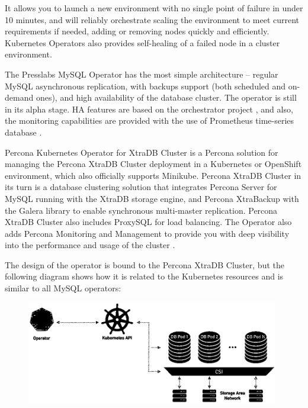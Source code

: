 \documentclass[10pt, a5paper]{article}
\begin{document}
It allows you to launch a new environment with no single point of failure in under 10 minutes, and will reliably orchestrate scaling the environment to meet current requirements if needed, adding or removing nodes quickly and efficiently. Kubernetes Operators also provides self-healing of a failed node in a cluster environment.

The Presslabs MySQL Operator \cite{bib1} has the most simple architecture -- regular MySQL asynchronous replication, with backups support (both scheduled and on-demand ones), and high availability of the database cluster. The operator is still in its alpha stage. HA features are based on the orchestrator project \cite{bib4}, and also, the monitoring capabilities are provided with the use of Prometheus time-series database \cite{bib5}.

Percona Kubernetes Operator for XtraDB Cluster \cite{bib2} is a Percona solution for managing the Percona XtraDB Cluster deployment in a Kubernetes or OpenShift environment, which also officially supports Minikube. Percona XtraDB Cluster in its turn is a database clustering solution that integrates Percona Server for MySQL running with the XtraDB storage engine, and Percona XtraBackup with the Galera \linebreak library to enable synchronous multi-master replication. Percona XtraDB Cluster also includes ProxySQL for load balancing. The Operator also adds Percona Monitoring and Management \cite{bib6} to provide you with deep visibility into the performance and usage of the cluster \cite{bib7}.

The design of the operator is bound to the Percona XtraDB Cluster, but the following diagram shows how it is related to the Kubernetes resources and is similar to all MySQL operators:

\begin{center}
\begin{figure}[h!]
  \centering
  \includegraphics[width=11cm]{19_2019_Marzhan.jpg}
  \label{fig1}
\end{figure}
\end{center}
\end{document}
